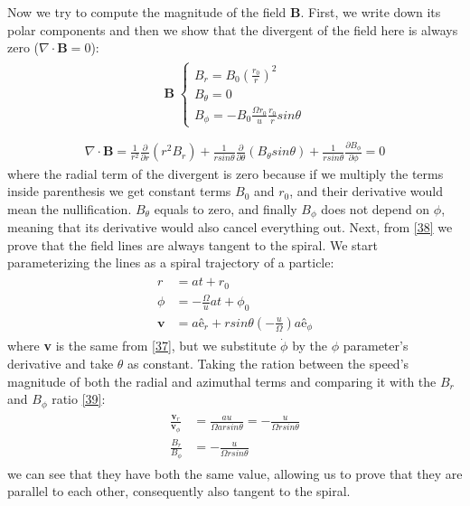 \documentclass[12pt,a4paper]{article}
\begin{document}
Now we try to compute the magnitude of the field \textbf{B}. First, we write down its polar components and then we show that the divergent of the field here is always zero ($\nabla\cdot\textbf{B}=0$):
\begin{align}
\label{39}
    \begin{split}
    \textbf{B}\;
    \begin{cases}
        B_r=B_0(\frac{r_0}{r})^2 \\
        B_\theta=0 \\
        B_\phi=-B_0\frac{\Omega r_0}{u}\frac{r_0}{r}sin\theta
        \end{cases} \\ 
    \end{split}
\end{align}
\begin{align}
    \nabla\cdot\textbf{B}=\frac{1}{r^2}\frac{\partial}{\partial r}(r^2B_r)+\frac{1}{rsin\theta}\frac{\partial}{\partial\theta}(B_\theta sin\theta)+\frac{1}{rsin\theta}\frac{\partial B_\phi}{\partial\phi}=0
\end{align}
where the radial term of the divergent is zero because if we multiply the terms inside parenthesis we get constant terms $B_0$ and $r_0$, and their derivative would mean the nullification. $B_\theta$ equals to zero, and finally $B_\phi$ does not depend on $\phi$, meaning that its derivative would also cancel everything out. Next, from \eqref{38} we prove that the field lines are always tangent to the spiral. We start parameterizing the lines as a spiral trajectory of a particle:
\begin{align}
\begin{split}
    r&=at+r_0 \\
    \phi&=-\frac{\Omega}{u}at+\phi_0 \\
    \textbf{v}&=aê_r+rsin\theta(-\frac{u}{\Omega})aê_\phi
\end{split}
\end{align}
where \textbf{v} is the same from \eqref{37}, but we substitute $\dot{\phi}$ by the $\phi$ parameter's derivative and take $\theta$ as constant. Taking the ration between the speed's magnitude of both the radial and azimuthal terms and comparing it with the $B_r$ and $B_\phi$ ratio \eqref{39}:
\begin{align}
\begin{split}
    \frac{\textbf{v}_r}{\textbf{v}_\phi}&=\frac{au}{\Omega arsin\theta}=-\frac{u}{\Omega rsin\theta} \\
    \frac{B_r}{B_\phi}&=-\frac{u}{\Omega rsin\theta}
    \end{split}
\end{align}
we can see that they have both the same value, allowing us to prove that they are parallel to each other, consequently also tangent to the spiral.
\end{document}
